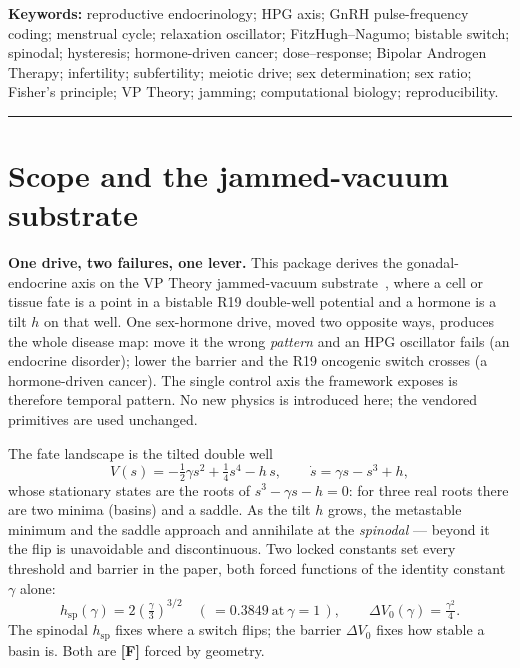 \documentclass[11pt]{article}
\newcommand{\gradeF}{\textcolor{forced}{\textbf{[F]}}}
\begin{document}
\vspace{0.4em}
\textbf{Keywords:} reproductive endocrinology; HPG axis; GnRH pulse-frequency coding; menstrual cycle;
relaxation oscillator; FitzHugh--Nagumo; bistable switch; spinodal; hysteresis; hormone-driven cancer;
dose--response; Bipolar Androgen Therapy; infertility; subfertility; meiotic drive; sex determination;
sex ratio; Fisher's principle; VP Theory; jamming; computational biology; reproducibility.

\vspace{0.4em}
\hrule

\section{Scope and the jammed-vacuum substrate}

\textbf{One drive, two failures, one lever.} This package derives the gonadal-endocrine axis on the VP
Theory jammed-vacuum substrate~\cite{vptheory}, where a cell or tissue fate is a point in a bistable R19
double-well potential and a hormone is a tilt $h$ on that well. One sex-hormone drive, moved two opposite
ways, produces the whole disease map: move it the wrong \emph{pattern} and an HPG oscillator fails (an
endocrine disorder); lower the barrier and the R19 oncogenic switch crosses (a hormone-driven cancer). The
single control axis the framework exposes is therefore temporal pattern. No new physics is introduced here;
the vendored primitives are used unchanged.

The fate landscape is the tilted double well
\begin{equation}
V(s) = -\tfrac{1}{2}\gamma s^{2} + \tfrac{1}{4}s^{4} - h\,s,
\qquad
\dot s = \gamma s - s^{3} + h,
\end{equation}
whose stationary states are the roots of $s^{3}-\gamma s - h = 0$: for three real roots there are two minima
(basins) and a saddle. As the tilt $h$ grows, the metastable minimum and the saddle approach and annihilate
at the \emph{spinodal} --- beyond it the flip is unavoidable and discontinuous. Two locked constants set
every threshold and barrier in the paper, both forced functions of the identity constant $\gamma$ alone:
\begin{equation}
h_{\mathrm{sp}}(\gamma) = 2\left(\tfrac{\gamma}{3}\right)^{3/2}
\quad(\,= 0.3849\ \text{at}\ \gamma=1\,),
\qquad
\Delta V_{0}(\gamma) = \tfrac{\gamma^{2}}{4}.
\end{equation}
The spinodal $h_{\mathrm{sp}}$ fixes where a switch flips; the barrier $\Delta V_{0}$ fixes how stable a
basin is. Both are \gradeF{} forced by geometry.
\end{document}
